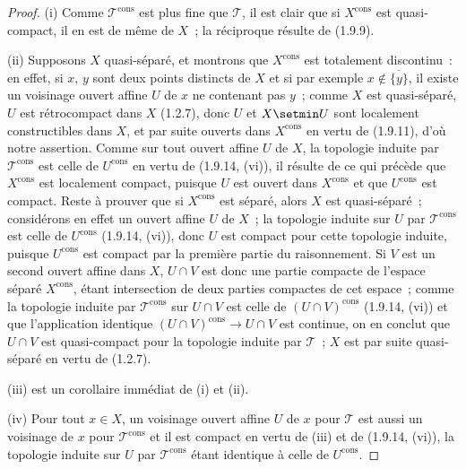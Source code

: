\begin{proof}
(i) Comme $\mathscr T^{\mathrm{cons}}$ est plus fine que $\mathscr T$, il est
clair que si $X^{\mathrm{cons}}$ est quasi-compact, il en est de même de $X$~;
la réciproque résulte de (1.9.9).

(ii) Supposons $X$ quasi-séparé, et montrons que $X^{\mathrm{cons}}$ est
totalement discontinu~: en effet, si $x$, $y$ sont deux points distincts de
$X$ et si par exemple $x\notin\overline{\{y\}}$, il existe un
voisinage ouvert affine $U$ de $x$ ne contenant pas $y$~; comme $X$ est
quasi-séparé, $U$ est rétrocompact dans $X$ (1.2.7), donc $U$ et $X\setmin U$ sont
localement constructibles dans $X$, et par suite ouverts dans
$X^{\mathrm{cons}}$ en vertu de (1.9.11), d'où notre assertion. Comme sur tout
ouvert affine $U$ de $X$, la topologie induite par $\mathscr T^{\mathrm{cons}}$
est celle de $U^{\mathrm{cons}}$ en vertu de (1.9.14, (vi)), il résulte de ce
qui précède que $X^{\mathrm{cons}}$ est localement compact, puisque $U$ est
ouvert dans $X^{\mathrm{cons}}$ et que $U^{\mathrm{cons}}$ est compact. Reste à
prouver que si $X^{\mathrm{cons}}$ est séparé, alors $X$ est quasi-séparé~;
considérons en effet un ouvert affine $U$ de $X$~; la topologie induite sur
$U$ par $\mathscr T^{\mathrm{cons}}$ est celle de $U^{\mathrm{cons}}$
(1.9.14, (vi)), donc $U$ est compact pour cette topologie induite, puisque
$U^{\mathrm{cons}}$ est compact par la première partie du raisonnement. Si
$V$ est un second ouvert affine dans $X$, $U\cap V$ est donc une partie
compacte de l'espace séparé $X^{\mathrm{cons}}$, étant intersection de deux
parties compactes de cet espace~; comme la topologie induite par
$\mathscr T^{\mathrm{cons}}$ sur $U\cap V$ est celle de
$(U\cap V)^{\mathrm{cons}}$ (1.9.14, (vi)) et que l'application identique
$(U\cap V)^{\mathrm{cons}}\to U\cap V$ est continue, on en conclut que
$U\cap V$ est quasi-compact pour la topologie induite par $\mathscr T$~; $X$
est par suite quasi-séparé en vertu de (1.2.7).

(iii) est un corollaire immédiat de (i) et (ii).

(iv) Pour tout $x\in X$, un voisinage ouvert affine $U$ de $x$ pour
$\mathscr T$ est aussi un voisinage de $x$ pour $\mathscr T^{\mathrm{cons}}$
et il est compact en vertu de (iii) et de (1.9.14, (vi)), la topologie induite
sur $U$ par $\mathscr T^{\mathrm{cons}}$ étant identique à celle de
$U^{\mathrm{cons}}$.


\end{proof}
